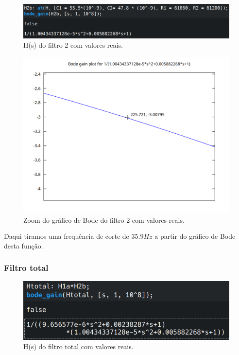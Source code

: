 \documentclass[12pt,twoside, a4paper, twocolumn]{article}
\begin{document}
\begin{figure}[h]
    \centering
    \includegraphics[width=1\columnwidth]{images/hsfiltro2.png}
    \caption{H(s) do filtro 2 com valores reais.}
\end{figure}


\begin{figure}[h]
    \centering
    \includegraphics[width=1\columnwidth]{images/zoomH2.png}
    \caption{Zoom do gráfico de Bode do filtro 2 com valores reais.}
\end{figure}


Daqui tiramos uma frequência de corte de $35.9Hz$ a partir do gráfico de Bode desta função.




\pagebreak
\subsubsection{Filtro total}


\begin{figure}[htbp!]
    \centering
    \includegraphics[width=1\columnwidth]{images/hsfiltrototal.png}
    \caption{H(s) do filtro total com valores reais.}
\end{figure}
\end{document}
